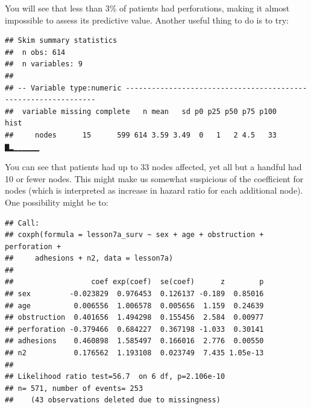 \documentclass[]{book}
\newenvironment{Shaded}{\begin{snugshade}}{\end{snugshade}}
\newcommand{\CommentTok}[1]{\textcolor[rgb]{0.56,0.35,0.01}{\textit{#1}}}
\newcommand{\DataTypeTok}[1]{\textcolor[rgb]{0.13,0.29,0.53}{#1}}
\newcommand{\DecValTok}[1]{\textcolor[rgb]{0.00,0.00,0.81}{#1}}
\newcommand{\KeywordTok}[1]{\textcolor[rgb]{0.13,0.29,0.53}{\textbf{#1}}}
\newcommand{\NormalTok}[1]{#1}
\newcommand{\OperatorTok}[1]{\textcolor[rgb]{0.81,0.36,0.00}{\textbf{#1}}}
\newcommand{\StringTok}[1]{\textcolor[rgb]{0.31,0.60,0.02}{#1}}
\begin{document}
You will see that less than 3\% of patients had perforations, making it
almost impossible to assess its predictive value. Another useful thing
to do is to try:

\begin{Shaded}
\end{Shaded}

\begin{verbatim}
## Skim summary statistics
##  n obs: 614 
##  n variables: 9 
## 
## -- Variable type:numeric ---------------------------------------------------------------
##  variable missing complete   n mean   sd p0 p25 p50 p75 p100     hist
##     nodes      15      599 614 3.59 3.49  0   1   2 4.5   33 ▇▂▁▁▁▁▁▁
\end{verbatim}

You can see that patients had up to 33 nodes affected, yet all but a
handful had 10 or fewer nodes. This might make us somewhat suspicious of
the coefficient for nodes (which is interpreted as increase in hazard
ratio for each additional node). One possibility might be to:

\begin{Shaded}
\end{Shaded}

\begin{verbatim}
## Call:
## coxph(formula = lesson7a_surv ~ sex + age + obstruction + perforation + 
##     adhesions + n2, data = lesson7a)
## 
##                  coef exp(coef)  se(coef)      z        p
## sex         -0.023829  0.976453  0.126137 -0.189  0.85016
## age          0.006556  1.006578  0.005656  1.159  0.24639
## obstruction  0.401656  1.494298  0.155456  2.584  0.00977
## perforation -0.379466  0.684227  0.367198 -1.033  0.30141
## adhesions    0.460898  1.585497  0.166016  2.776  0.00550
## n2           0.176562  1.193108  0.023749  7.435 1.05e-13
## 
## Likelihood ratio test=56.7  on 6 df, p=2.106e-10
## n= 571, number of events= 253 
##    (43 observations deleted due to missingness)
\end{verbatim}
\end{document}
